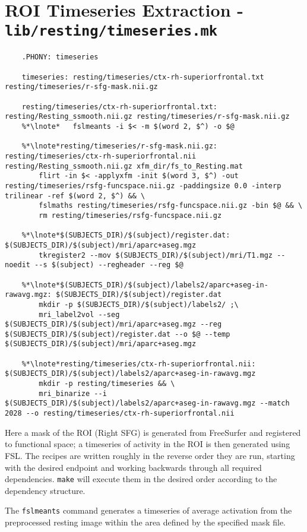 \section{ROI Timeseries Extraction - \texttt{lib/resting/timeseries.mk}}
\begin{lstlisting}
	.PHONY: timeseries
	
	timeseries: resting/timeseries/ctx-rh-superiorfrontal.txt resting/timeseries/r-sfg-mask.nii.gz
	
	resting/timeseries/ctx-rh-superiorfrontal.txt: resting/Resting_ssmooth.nii.gz resting/timeseries/r-sfg-mask.nii.gz
	%*\lnote*	fslmeants -i $< -m $(word 2, $^) -o $@
	
	%*\lnote*resting/timeseries/r-sfg-mask.nii.gz: resting/timeseries/ctx-rh-superiorfrontal.nii resting/Resting_ssmooth.nii.gz xfm_dir/fs_to_Resting.mat
		flirt -in $< -applyxfm -init $(word 3, $^) -out resting/timeseries/rsfg-funcspace.nii.gz -paddingsize 0.0 -interp trilinear -ref $(word 2, $^) && \
		fslmaths resting/timeseries/rsfg-funcspace.nii.gz -bin $@ && \
		rm resting/timeseries/rsfg-funcspace.nii.gz
	
	%*\lnote*$(SUBJECTS_DIR)/$(subject)/register.dat: $(SUBJECTS_DIR)/$(subject)/mri/aparc+aseg.mgz
		tkregister2 --mov $(SUBJECTS_DIR)/$(subject)/mri/T1.mgz --noedit --s $(subject) --regheader --reg $@
	
	%*\lnote*$(SUBJECTS_DIR)/$(subject)/labels2/aparc+aseg-in-rawavg.mgz: $(SUBJECTS_DIR)/$(subject)/register.dat
		mkdir -p $(SUBJECTS_DIR)/$(subject)/labels2/ ;\
		mri_label2vol --seg $(SUBJECTS_DIR)/$(subject)/mri/aparc+aseg.mgz --reg $(SUBJECTS_DIR)/$(subject)/register.dat --o $@ --temp $(SUBJECTS_DIR)/$(subject)/mri/aparc+aseg.mgz
	
	%*\lnote*resting/timeseries/ctx-rh-superiorfrontal.nii: $(SUBJECTS_DIR)/$(subject)/labels2/aparc+aseg-in-rawavg.mgz
		mkdir -p resting/timeseries && \
		mri_binarize --i $(SUBJECTS_DIR)/$(subject)/labels2/aparc+aseg-in-rawavg.mgz --match 2028 --o resting/timeseries/ctx-rh-superiorfrontal.nii
\end{lstlisting}
Here a mask of the ROI (Right SFG) is generated from FreeSurfer and registered to functional space; a timeseries of activity in the ROI is then generated using FSL. The recipes are written roughly in the reverse order they are run, starting with the desired endpoint and working backwards through all required dependencies. \texttt{make} will execute them in the desired order according to the dependency structure.

\lnum{36}The \texttt{fslmeants} command generates a timeseries of average activation from the preprocessed resting image within the area defined by the specified mask file.

